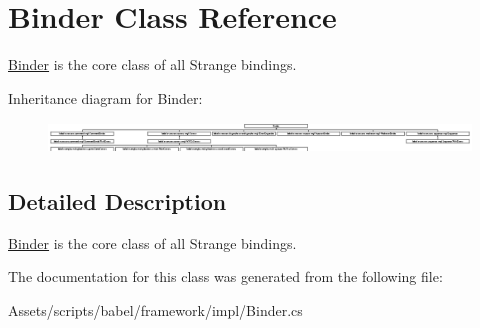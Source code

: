 \hypertarget{class_binder}{\section{Binder Class Reference}
\label{class_binder}
}


\hyperlink{class_binder}{Binder} is the core class of all Strange bindings.  


Inheritance diagram for Binder\-:\begin{figure}[H]
\begin{center}
\leavevmode
\includegraphics[height=0.812183cm]{class_binder}
\end{center}
\end{figure}


\subsection{Detailed Description}
\hyperlink{class_binder}{Binder} is the core class of all Strange bindings. 

The documentation for this class was generated from the following file\-:\begin{DoxyCompactItemize}
\item 
Assets/scripts/babel/framework/impl/Binder.\-cs\end{DoxyCompactItemize}
